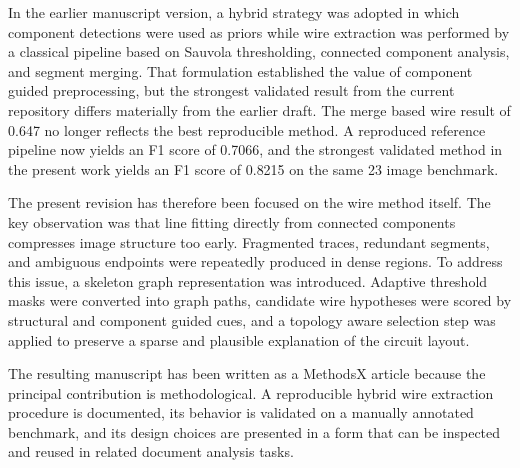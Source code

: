 In the earlier manuscript version, a hybrid strategy was adopted in which component detections were used as priors while wire extraction was performed by a classical pipeline based on Sauvola thresholding, connected component analysis, and segment merging. That formulation established the value of component guided preprocessing, but the strongest validated result from the current repository differs materially from the earlier draft. The merge based wire result of 0.647 no longer reflects the best reproducible method. A reproduced reference pipeline now yields an F1 score of 0.7066, and the strongest validated method in the present work yields an F1 score of 0.8215 on the same 23 image benchmark.

The present revision has therefore been focused on the wire method itself. The key observation was that line fitting directly from connected components compresses image structure too early. Fragmented traces, redundant segments, and ambiguous endpoints were repeatedly produced in dense regions. To address this issue, a skeleton graph representation was introduced. Adaptive threshold masks were converted into graph paths, candidate wire hypotheses were scored by structural and component guided cues, and a topology aware selection step was applied to preserve a sparse and plausible explanation of the circuit layout.

The resulting manuscript has been written as a MethodsX article because the principal contribution is methodological. A reproducible hybrid wire extraction procedure is documented, its behavior is validated on a manually annotated benchmark, and its design choices are presented in a form that can be inspected and reused in related document analysis tasks.
